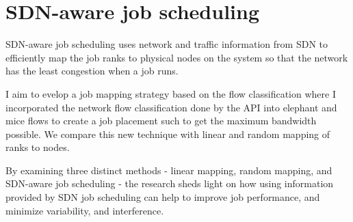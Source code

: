 \section{SDN-aware job scheduling}

SDN-aware job scheduling uses network and traffic information from
SDN to efficiently map the job ranks to physical nodes on the system 
so that the network has the least congestion when a job runs.


I aim to evelop a job mapping strategy based on the 
flow classification where I incorporated the network flow 
classification done by the API into elephant and mice flows 
to create a job placement such to get the maximum bandwidth possible. 
We compare this new technique with linear and random mapping of ranks to nodes.


By examining three distinct 
methods - linear mapping, random mapping, and SDN-aware job scheduling - 
the research sheds light on how using information provided by SDN 
job scheduling can help to improve job performance, and minimize
variability, and interference. 

